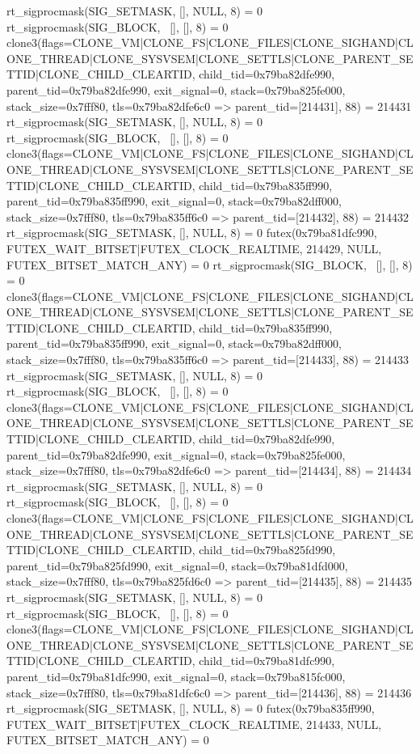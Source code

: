 \begin{breakableverbatim}
rt_sigprocmask(SIG_SETMASK, [], NULL, 8) = 0
rt_sigprocmask(SIG_BLOCK, ~[], [], 8)   = 0
clone3({flags=CLONE_VM|CLONE_FS|CLONE_FILES|CLONE_SIGHAND|CLONE_THREAD|CLONE_SYSVSEM|CLONE_SETTLS|CLONE_PARENT_SETTID|CLONE_CHILD_CLEARTID, child_tid=0x79ba82dfe990, parent_tid=0x79ba82dfe990, exit_signal=0, stack=0x79ba825fe000, stack_size=0x7fff80, tls=0x79ba82dfe6c0} => {parent_tid=[214431]}, 88) = 214431
rt_sigprocmask(SIG_SETMASK, [], NULL, 8) = 0
rt_sigprocmask(SIG_BLOCK, ~[], [], 8)   = 0
clone3({flags=CLONE_VM|CLONE_FS|CLONE_FILES|CLONE_SIGHAND|CLONE_THREAD|CLONE_SYSVSEM|CLONE_SETTLS|CLONE_PARENT_SETTID|CLONE_CHILD_CLEARTID, child_tid=0x79ba835ff990, parent_tid=0x79ba835ff990, exit_signal=0, stack=0x79ba82dff000, stack_size=0x7fff80, tls=0x79ba835ff6c0} => {parent_tid=[214432]}, 88) = 214432
rt_sigprocmask(SIG_SETMASK, [], NULL, 8) = 0
futex(0x79ba81dfc990, FUTEX_WAIT_BITSET|FUTEX_CLOCK_REALTIME, 214429, NULL, FUTEX_BITSET_MATCH_ANY) = 0
rt_sigprocmask(SIG_BLOCK, ~[], [], 8)   = 0
clone3({flags=CLONE_VM|CLONE_FS|CLONE_FILES|CLONE_SIGHAND|CLONE_THREAD|CLONE_SYSVSEM|CLONE_SETTLS|CLONE_PARENT_SETTID|CLONE_CHILD_CLEARTID, child_tid=0x79ba835ff990, parent_tid=0x79ba835ff990, exit_signal=0, stack=0x79ba82dff000, stack_size=0x7fff80, tls=0x79ba835ff6c0} => {parent_tid=[214433]}, 88) = 214433
rt_sigprocmask(SIG_SETMASK, [], NULL, 8) = 0
rt_sigprocmask(SIG_BLOCK, ~[], [], 8)   = 0
clone3({flags=CLONE_VM|CLONE_FS|CLONE_FILES|CLONE_SIGHAND|CLONE_THREAD|CLONE_SYSVSEM|CLONE_SETTLS|CLONE_PARENT_SETTID|CLONE_CHILD_CLEARTID, child_tid=0x79ba82dfe990, parent_tid=0x79ba82dfe990, exit_signal=0, stack=0x79ba825fe000, stack_size=0x7fff80, tls=0x79ba82dfe6c0} => {parent_tid=[214434]}, 88) = 214434
rt_sigprocmask(SIG_SETMASK, [], NULL, 8) = 0
rt_sigprocmask(SIG_BLOCK, ~[], [], 8)   = 0
clone3({flags=CLONE_VM|CLONE_FS|CLONE_FILES|CLONE_SIGHAND|CLONE_THREAD|CLONE_SYSVSEM|CLONE_SETTLS|CLONE_PARENT_SETTID|CLONE_CHILD_CLEARTID, child_tid=0x79ba825fd990, parent_tid=0x79ba825fd990, exit_signal=0, stack=0x79ba81dfd000, stack_size=0x7fff80, tls=0x79ba825fd6c0} => {parent_tid=[214435]}, 88) = 214435
rt_sigprocmask(SIG_SETMASK, [], NULL, 8) = 0
rt_sigprocmask(SIG_BLOCK, ~[], [], 8)   = 0
clone3({flags=CLONE_VM|CLONE_FS|CLONE_FILES|CLONE_SIGHAND|CLONE_THREAD|CLONE_SYSVSEM|CLONE_SETTLS|CLONE_PARENT_SETTID|CLONE_CHILD_CLEARTID, child_tid=0x79ba81dfc990, parent_tid=0x79ba81dfc990, exit_signal=0, stack=0x79ba815fc000, stack_size=0x7fff80, tls=0x79ba81dfc6c0} => {parent_tid=[214436]}, 88) = 214436
rt_sigprocmask(SIG_SETMASK, [], NULL, 8) = 0
futex(0x79ba835ff990, FUTEX_WAIT_BITSET|FUTEX_CLOCK_REALTIME, 214433, NULL, FUTEX_BITSET_MATCH_ANY) = 0

\end{breakableverbatim}
